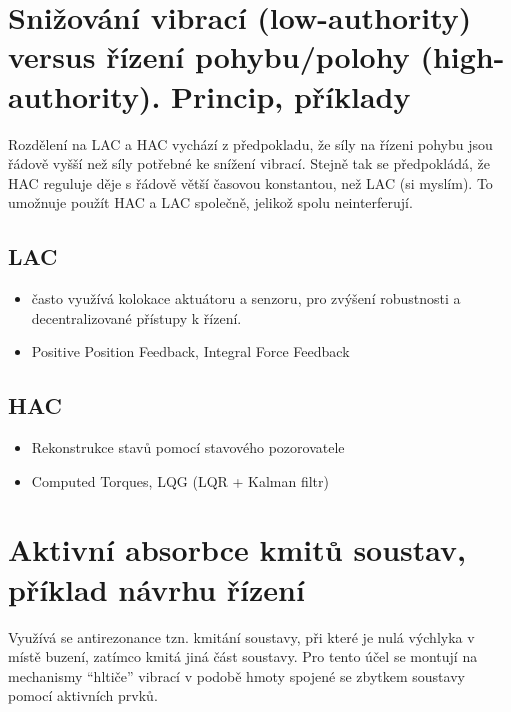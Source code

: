 \documentclass{article}
\begin{document}
	\section{Snižování vibrací (low-authority) versus řízení pohybu/polohy (high-authority). Princip, příklady}
	
	Rozdělení na LAC a HAC vychází z předpokladu, že síly na řízeni pohybu jsou řádově vyšší než síly potřebné ke snížení vibrací. Stejně tak se předpokládá, že HAC reguluje děje s řádově větší časovou konstantou, než LAC (si myslím). To umožnuje použít HAC a LAC společně, jelikož spolu neinterferují.

	\subsection*{LAC}
	\begin{itemize}
		\item často využívá kolokace aktuátoru a senzoru, pro zvýšení robustnosti a decentralizované přístupy k řízení.
		\item Positive Position Feedback, Integral Force Feedback
	\end{itemize}

	\subsection*{HAC}
	\begin{itemize}
		\item Rekonstrukce stavů pomocí stavového pozorovatele
		\item Computed Torques, LQG (LQR + Kalman filtr)
	\end{itemize}

	\section{Aktivní absorbce kmitů soustav, příklad návrhu řízení}
	
	Využívá se antirezonance tzn. kmitání soustavy, při které je nulá výchlyka v místě buzení, zatímco kmitá jiná část soustavy. Pro tento účel se montují na mechanismy ``hltiče'' vibrací v podobě hmoty spojené se zbytkem soustavy pomocí aktivních prvků.
\end{document}

